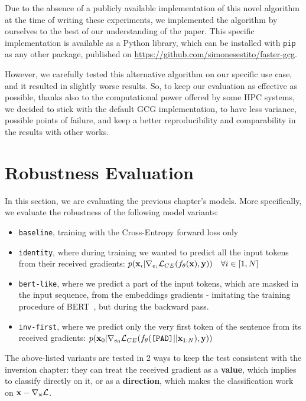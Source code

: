 \documentclass[../thesis.tex]{subfiles}
\begin{document}
Due to the absence of a publicly available implementation of this novel algorithm at the time of writing these experiments, we implemented the algorithm by ourselves to the best of our understanding of the paper.
This specific implementation is available as a Python library, which can be installed with \texttt{pip} as any other package, published on \url{https://github.com/simonesestito/faster-gcg}.

However, we carefully tested this alternative algorithm on our specific use case, and it resulted in slightly worse results. So, to keep our evaluation as effective as possible, thanks also to the computational power offered by some HPC systems, we decided to stick with the default GCG implementation, to have less variance, possible points of failure, and keep a better reproducibility and comparability in the results with other works.

\section{Robustness Evaluation}
In this section, we are evaluating the previous chapter's models.
More specifically, we evaluate the robustness of the following model variants:
\begin{itemize}
    \item \texttt{baseline}, training with the Cross-Entropy forward loss only
    \item \texttt{identity}, where during training we wanted to predict all the input tokens from their received gradients: $p(\mathbf{x}_i | \nabla_{e_i} \mathcal{L}_{CE}(f_\theta(\mathbf{x}), \mathbf{y})) \quad \forall i \in [1, N]$
    \item \texttt{bert-like}, where we predict a part of the input tokens, which are masked in the input sequence, from the embeddings gradients - imitating the training procedure of BERT~\cite{devlin2019bert}, but during the backward pass.
    \item \texttt{inv-first}, where we predict only the very first token of the sentence from its received gradients:
    $p(\mathbf{x}_0 | \nabla_{e_0} \mathcal{L}_{CE}(f_\theta(\text{\texttt{[PAD]}} || \mathbf{x}_{1:N}), \mathbf{y}))$
\end{itemize}

The above-listed variants are tested in 2 ways to keep the test consistent with the inversion chapter:
they can treat the received gradient as a \textbf{value}, which implies to classify directly on it, or as a \textbf{direction}, which makes the classification work on $\mathbf{x} - \nabla_{\mathbf{x}} \mathcal{L}$.
\end{document}

